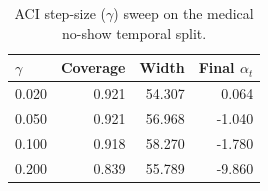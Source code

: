 \begin{table}[htbp]
\centering
\caption{ACI step-size ($\gamma$) sweep on the medical no-show temporal split.}
\label{tab:aci-gamma}
\begin{tabular}{lrrr}
\toprule
$\gamma$ & Coverage & Width & Final $\alpha_t$ \\
\midrule
0.020 & 0.921 & 54.307 & 0.064 \\
0.050 & 0.921 & 56.968 & -1.040 \\
0.100 & 0.918 & 58.270 & -1.780 \\
0.200 & 0.839 & 55.789 & -9.860 \\
\bottomrule
\end{tabular}
\end{table}
